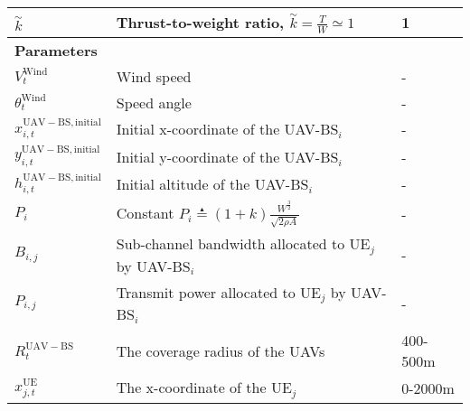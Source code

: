 \begin{table*}
\begin{adjustbox}{width=\columnwidth,center}
\begin{latin}
\begin{tabular}{|lll|}
\multicolumn{1}{|l|}{$\overset{\sim}{k}$}                      & \multicolumn{1}{l|}{Thrust-to-weight ratio, $\overset{\sim}{k} =\frac{T}{W}\simeq 1$}                     &         1\        \\ \hline
\multicolumn{3}{|l|}{\textbf{Parameters}}                                 \\  \hline
\multicolumn{1}{|l|}{$V_{t}^{\mathrm{Wind}}$}                      & \multicolumn{1}{l|}{Wind speed}                     &    -             \\ 
\multicolumn{1}{|l|}{$\theta_{t}^{\mathrm{Wind}}$}                      & \multicolumn{1}{l|}{Speed angle}                     &  -              \\ 
\multicolumn{1}{|l|}{$x_{i,t}^{\mathrm{UAV-BS,initial}}$}                      & \multicolumn{1}{l|}{Initial x-coordinate of the UAV-BS$_{i}$}                     &  -               \\ 
\multicolumn{1}{|l|}{$y_{i,t}^{\mathrm{UAV-BS,initial}}$}                      &  \multicolumn{1}{l|}{Initial y-coordinate of the UAV-BS$_{i}$}                     &  -               \\  
\multicolumn{1}{|l|}{$h_{i,t}^{\mathrm{UAV-BS,initial}}$}                      & \multicolumn{1}{l|}{Initial altitude of the UAV-BS$_{i}$}                     &    -             \\ 
\multicolumn{1}{|l|}{$P_{i}$}                      & \multicolumn{1}{l|}{Constant $P_{i}\overset{\underset{\mathrm{\blacktriangle}}{}}{=}(1+k)\frac{W_{}^{\frac{3}{2}}}{\sqrt{2\rho A}}$}                     &  -               \\ 
\multicolumn{1}{|l|}{$B_{i,j}$}                      & \multicolumn{1}{l|}{Sub-channel bandwidth allocated to UE$_{j}$ by UAV-BS$_{i}$ }                     &   -              \\ 
\multicolumn{1}{|l|}{$P_{i,j}$}                      & \multicolumn{1}{l|}{Transmit power allocated to UE$_{j}$ by UAV-BS$_{i}$ }                     &     -            \\ 

\multicolumn{1}{|l|}{$R_{t}^{\mathrm{UAV-BS}}$}                      & \multicolumn{1}{l|}{The coverage radius of the UAVs}                     &     400-500m            \\ 



\multicolumn{1}{|l|}{$x_{j,t}^{\mathrm{UE}}$}                      & \multicolumn{1}{l|}{The x-coordinate of the UE$_{j}$}                     &     0-2000m           \\ 



\end{tabular}
\end{latin}
\end{adjustbox}
\end{table*}
